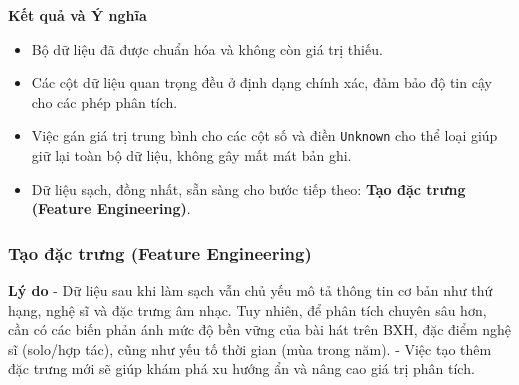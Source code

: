 \textbf{Kết quả và Ý nghĩa} 

\begin{itemize}
    \item Bộ dữ liệu đã được chuẩn hóa và không còn giá trị thiếu.
    \item Các cột dữ liệu quan trọng đều ở định dạng chính xác, đảm bảo độ tin cậy cho các phép phân tích.
    \item Việc gán giá trị trung bình cho các cột số và điền \texttt{Unknown} cho thể loại 
    giúp giữ lại toàn bộ dữ liệu, không gây mất mát bản ghi.
    \item Dữ liệu sạch, đồng nhất, sẵn sàng cho bước tiếp theo: \textbf{Tạo đặc trưng (Feature Engineering)}.
\end{itemize}

\subsubsection{Tạo đặc trưng (Feature Engineering)}

\textbf{Lý do} 
- Dữ liệu sau khi làm sạch vẫn chủ yếu mô tả thông tin cơ bản như thứ hạng, nghệ sĩ và đặc trưng âm nhạc. 
Tuy nhiên, để phân tích chuyên sâu hơn, cần có các biến phản ánh mức độ bền vững của bài hát trên BXH, 
đặc điểm nghệ sĩ (solo/hợp tác), cũng như yếu tố thời gian (mùa trong năm). 
- Việc tạo thêm đặc trưng mới sẽ giúp khám phá xu hướng ẩn và nâng cao giá trị phân tích. \\

